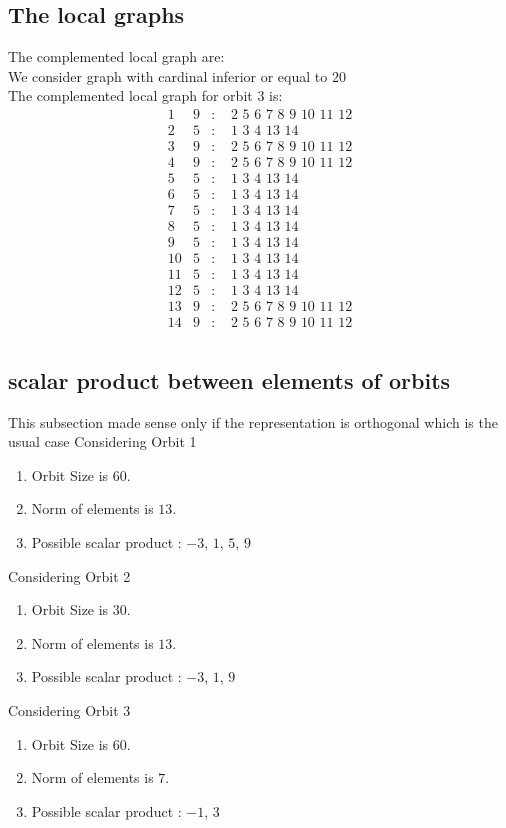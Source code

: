 \documentclass[12pt]{article}
\begin{document}
\subsection{The local graphs}
The complemented local graph are:\\
We consider graph with cardinal inferior or equal to $20$\\
The complemented local graph for orbit $3$ is:
\begin{equation*}
\begin{array}{rrcl}
1&9&:&\,\,2\,\,5\,\,6\,\,7\,\,8\,\,9\,\,10\,\,11\,\,12\\
2&5&:&\,\,1\,\,3\,\,4\,\,13\,\,14\\
3&9&:&\,\,2\,\,5\,\,6\,\,7\,\,8\,\,9\,\,10\,\,11\,\,12\\
4&9&:&\,\,2\,\,5\,\,6\,\,7\,\,8\,\,9\,\,10\,\,11\,\,12\\
5&5&:&\,\,1\,\,3\,\,4\,\,13\,\,14\\
6&5&:&\,\,1\,\,3\,\,4\,\,13\,\,14\\
7&5&:&\,\,1\,\,3\,\,4\,\,13\,\,14\\
8&5&:&\,\,1\,\,3\,\,4\,\,13\,\,14\\
9&5&:&\,\,1\,\,3\,\,4\,\,13\,\,14\\
10&5&:&\,\,1\,\,3\,\,4\,\,13\,\,14\\
11&5&:&\,\,1\,\,3\,\,4\,\,13\,\,14\\
12&5&:&\,\,1\,\,3\,\,4\,\,13\,\,14\\
13&9&:&\,\,2\,\,5\,\,6\,\,7\,\,8\,\,9\,\,10\,\,11\,\,12\\
14&9&:&\,\,2\,\,5\,\,6\,\,7\,\,8\,\,9\,\,10\,\,11\,\,12\\
\end{array}
\end{equation*}
\subsection{scalar product between elements of orbits}
\noindent This subsection made sense only if the representation is orthogonal which is the usual case
Considering Orbit 1
\begin{enumerate}
\item Orbit Size is $60$.
\item Norm of elements is $13$.
\item Possible scalar product : $-3$, $1$, $5$, $9$
\end{enumerate}
Considering Orbit 2
\begin{enumerate}
\item Orbit Size is $30$.
\item Norm of elements is $13$.
\item Possible scalar product : $-3$, $1$, $9$
\end{enumerate}
Considering Orbit 3
\begin{enumerate}
\item Orbit Size is $60$.
\item Norm of elements is $7$.
\item Possible scalar product : $-1$, $3$
\end{enumerate}
\end{document}
